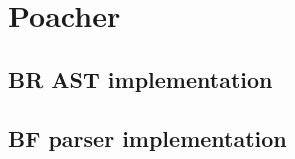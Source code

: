 \documentclass[../main]{subfiles}
\begin{document}
\section{
  Poacher
}

\subsection{
  BR AST implementation
}
\label{app:bf-ast}



\clearpage{} %

\subsection{
  BF parser implementation
}
\label{app:bf-parser}


\end{document}
